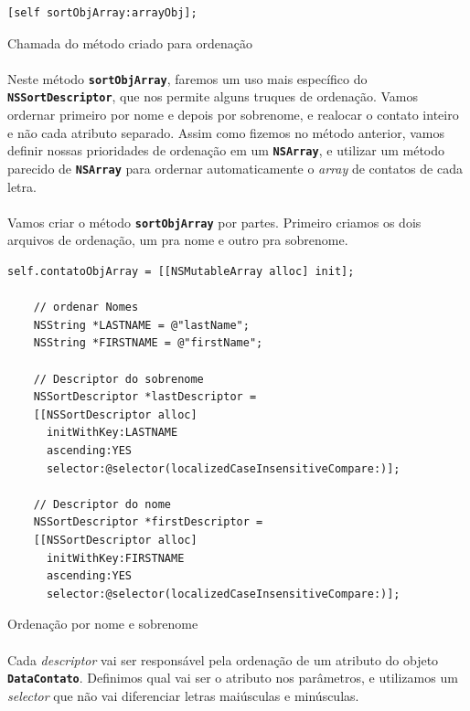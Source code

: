 \documentclass[a4paper,12pt,brazil,doubleside]{book}
\begin{document}
\begin{singlespace}
\begin{listing}[H]
\begin{verbatim}
[self sortObjArray:arrayObj];
\end{verbatim}
\caption{Chamada do método criado para ordenação}
\end{listing}

\paragraph{}Neste método \texttt{\textbf{sortObjArray}}, faremos um uso mais específico do \texttt{\textbf{NSSortDescriptor}}, que nos permite alguns truques de ordenação. Vamos ordernar primeiro por nome e depois por sobrenome, e realocar o contato inteiro e não cada atributo separado. Assim como fizemos no método anterior, vamos definir nossas prioridades de ordenação em um \texttt{\textbf{NSArray}}, e utilizar um método parecido de \texttt{\textbf{NSArray}} para ordernar automaticamente o \emph{array} de contatos de cada letra.\\
\paragraph{}Vamos criar o método \texttt{\textbf{sortObjArray}} por partes. Primeiro criamos os dois arquivos de ordenação, um pra nome e outro pra sobrenome.

\begin{listing}[H]
\begin{verbatim}
self.contatoObjArray = [[NSMutableArray alloc] init];
    
    // ordenar Nomes
    NSString *LASTNAME = @"lastName";
    NSString *FIRSTNAME = @"firstName";
    
    // Descriptor do sobrenome
    NSSortDescriptor *lastDescriptor =
    [[NSSortDescriptor alloc]
      initWithKey:LASTNAME
      ascending:YES
      selector:@selector(localizedCaseInsensitiveCompare:)];
    
    // Descriptor do nome
    NSSortDescriptor *firstDescriptor =
    [[NSSortDescriptor alloc]
      initWithKey:FIRSTNAME
      ascending:YES
      selector:@selector(localizedCaseInsensitiveCompare:)];
\end{verbatim}
\caption{Ordenação por nome e sobrenome}
\end{listing}

\paragraph{}Cada \emph{descriptor} vai ser responsável pela ordenação de um atributo do objeto \texttt{\textbf{DataContato}}. Definimos qual vai ser o atributo nos parâmetros, e utilizamos um \emph{selector} que não vai diferenciar letras maiúsculas e minúsculas.

\end{singlespace}
\end{document}
